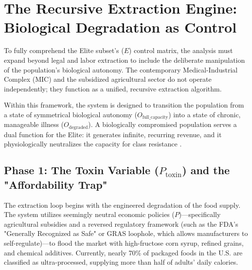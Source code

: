 \documentclass[12pt,openany]{book}
\begin{document}
\section{The Recursive Extraction Engine: Biological Degradation as Control}

To fully comprehend the Elite subset’s ($E$) control matrix, the analysis must expand beyond legal and labor extraction to include the deliberate manipulation of the population's biological autonomy. The contemporary Medical-Industrial Complex (MIC) and the subsidized agricultural sector do not operate independently; they function as a unified, recursive extraction algorithm.

Within this framework, the system is designed to transition the population from a state of symmetrical biological autonomy ($O_{\text{full\_capacity}}$) into a state of chronic, manageable illness ($O_{\text{degraded}}$). A biologically compromised population serves a dual function for the Elite: it generates infinite, recurring revenue, and it physiologically neutralizes the capacity for class resistance \cite{washington}.

\subsection{Phase 1: The Toxin Variable (\texorpdfstring{$P_{\text{toxin}}$}{P\_toxin}) and the "Affordability Trap"}

The extraction loop begins with the engineered degradation of the food supply. The system utilizes seemingly neutral economic policies ($P$)—specifically agricultural subsidies and a reversed regulatory framework (such as the FDA's "Generally Recognized as Safe" or GRAS loophole, which allows manufacturers to self-regulate)—to flood the market with high-fructose corn syrup, refined grains, and chemical additives. Currently, nearly 70\% of packaged foods in the U.S. are classified as ultra-processed, supplying more than half of adults' daily calories.
\end{document}
